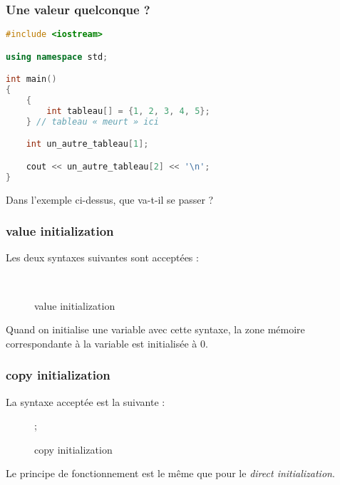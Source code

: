 \documentclass{cppcourses}
\begin{document}
\begin{frame}[fragile]

\frametitle{Une valeur quelconque ?}

\begin{example}

\begin{lstlisting}[language = c++]
#include <iostream>

using namespace std;

int main()
{
    {
        int tableau[] = {1, 2, 3, 4, 5};
    } // tableau « meurt » ici

    int un_autre_tableau[1];

    cout << un_autre_tableau[2] << '\n';
}
\end{lstlisting}

Dans l'exemple ci-dessus, que va-t-il se passer ?


\end{example}

\end{frame}

\begin{frame}

\frametitle{value initialization}

Les deux syntaxes suivantes sont acceptées :

\begin{figure}
\mykeyword{\textcolor{red}{<type>}();} \\
\mykeyword{\textcolor{red}{<type>} \textcolor{blue}{<identifiant>}\{\};}
\caption{value initialization}
\end{figure}

Quand on initialise une variable avec cette syntaxe, la zone mémoire correspondante à la variable \mykeyword{\textcolor{blue}{identifiant}} est initialisée à 0.


\end{frame}

\begin{frame}[fragile]

\frametitle{copy initialization}

La syntaxe acceptée est la suivante :

\begin{figure}
\mykeyword{\textcolor{red}{<type>} \textcolor{blue}{<identifiant>} = \textcolor{teal}{<autre>}};
\caption{copy initialization}
\end{figure}

Le principe de fonctionnement est le même que pour le \emph{direct initialization}.

\end{frame}
\end{document}

